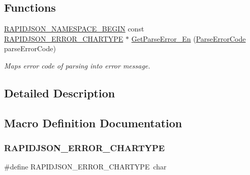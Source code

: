 \subsection*{Functions}
\begin{DoxyCompactItemize}
\item 
\hyperlink{group__RAPIDJSON__CONFIG_gad3806c8251fdc7da9618b7e922674ffc}{R\+A\+P\+I\+D\+J\+S\+O\+N\+\_\+\+N\+A\+M\+E\+S\+P\+A\+C\+E\+\_\+\+B\+E\+G\+IN} const \hyperlink{group__RAPIDJSON__ERRORS_ga7e4636fd48d0148f102b8a13f0539d8c}{R\+A\+P\+I\+D\+J\+S\+O\+N\+\_\+\+E\+R\+R\+O\+R\+\_\+\+C\+H\+A\+R\+T\+Y\+PE} $\ast$ \hyperlink{group__RAPIDJSON__ERRORS_ga28835eb93d2c3c07bbea13515eb31415}{Get\+Parse\+Error\+\_\+\+En} (\hyperlink{group__RAPIDJSON__ERRORS_ga8d4b32dfc45840bca189ade2bbcb6ba7}{Parse\+Error\+Code} parse\+Error\+Code)
\begin{DoxyCompactList}\small\item\em Maps error code of parsing into error message. \end{DoxyCompactList}\end{DoxyCompactItemize}


\subsection{Detailed Description}


\subsection{Macro Definition Documentation}
\mbox{\label{group__RAPIDJSON__ERRORS_ga7e4636fd48d0148f102b8a13f0539d8c}} 
\subsubsection{\texorpdfstring{R\+A\+P\+I\+D\+J\+S\+O\+N\+\_\+\+E\+R\+R\+O\+R\+\_\+\+C\+H\+A\+R\+T\+Y\+PE}{RAPIDJSON\_ERROR\_CHARTYPE}\hspace{0.1cm}{\footnotesize\ttfamily [1/2]}}
{\footnotesize\ttfamily \#define R\+A\+P\+I\+D\+J\+S\+O\+N\+\_\+\+E\+R\+R\+O\+R\+\_\+\+C\+H\+A\+R\+T\+Y\+PE~char}



